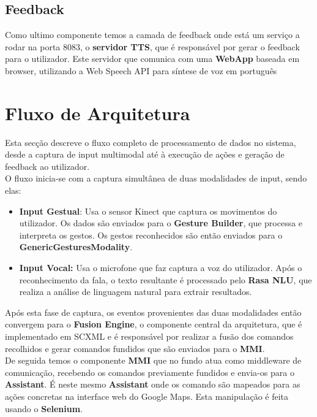 \documentclass{report}
\begin{document}
\subsection{Feedback}

Como ultimo componente temos a camada de feedback onde está um serviço a rodar na porta 8083, o \textbf{servidor TTS}, que é responsável por gerar o feedback para o utilizador. Este servidor que comunica com uma \textbf{WebApp} baseada em browser, utilizando a Web Speech API para síntese de voz em português

\newpage

\section{Fluxo de Arquitetura}
\label{sec:fluxo_arquitetura}

Esta secção descreve o fluxo completo de processamento de dados no sistema, desde a captura de input multimodal até à execução de ações e geração de feedback ao utilizador. \\

\noindent O fluxo inicia-se com a captura simultânea de duas modalidades de input, sendo elas:

\begin{itemize}
    \item \textbf{Input Gestual}: Usa o sensor Kinect que captura os movimentos do utilizador. Os dados são enviados para o \textbf{Gesture Builder}, que processa e interpreta os gestos. Os gestos reconhecidos são então enviados para o \textbf{GenericGesturesModality}.

    \item \textbf{Input Vocal:} Usa o microfone que faz captura a voz do utilizador. Após o reconhecimento da fala, o texto resultante é processado pelo \textbf{Rasa NLU}, que realiza a análise de linguagem natural para extrair resultados.
\end{itemize}

Após esta fase de captura, os eventos provenientes das duas modalidades então convergem para o  \textbf{Fusion Engine}, o componente central da arquitetura, que é implementado em SCXML e é responsável por realizar a fusão dos comandos recolhidos e gerar comandos fundidos que são enviados para o \textbf{MMI}. \\

De seguida temos o componente \textbf{MMI} que no fundo atua como middleware de comunicação, recebendo os comandos previamente fundidos e envia-os para o \textbf{Assistant}. É neste mesmo \textbf{Assistant} onde os comando são mapeados para as ações concretas na interface web do Google Maps. Esta manipulação é feita usando o \textbf{Selenium}. \\
\end{document}
